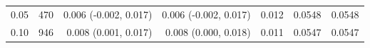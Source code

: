 \begin{tabular}{rrrrrrr}
0.05 & 470 & 0.006 (-0.002, 0.017) & 0.006 (-0.002, 0.017) & 0.012 & 0.0548 & 0.0548 \\
0.10 & 946 & 0.008 (0.001, 0.017) & 0.008 (0.000, 0.018) & 0.011 & 0.0547 & 0.0547 \\

\end{tabular}
